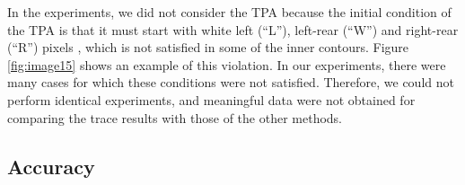 \documentclass[sensors,article,accept,moreauthors,pdftex,10pt,a4paper]{mdpi}
\newcommand{\JHMEMO}[1]{\textcolor{red}{#1}}
\begin{document}

In the experiments, we did not consider the TPA because the initial condition of the TPA is that it must start with white left (``L''), left-rear (``W'') and right-rear (``R'') pixels \cite{Ghuneim2015Contour}, which is not satisfied in some of the inner contours. Figure \ref{fig:image15} shows an example of this violation. In our experiments, there were many cases for which these conditions were not satisfied. Therefore, we could not perform identical experiments, and meaningful data were not obtained for comparing the trace results with those of the other methods. 



\subsection{Accuracy}

\end{document}
